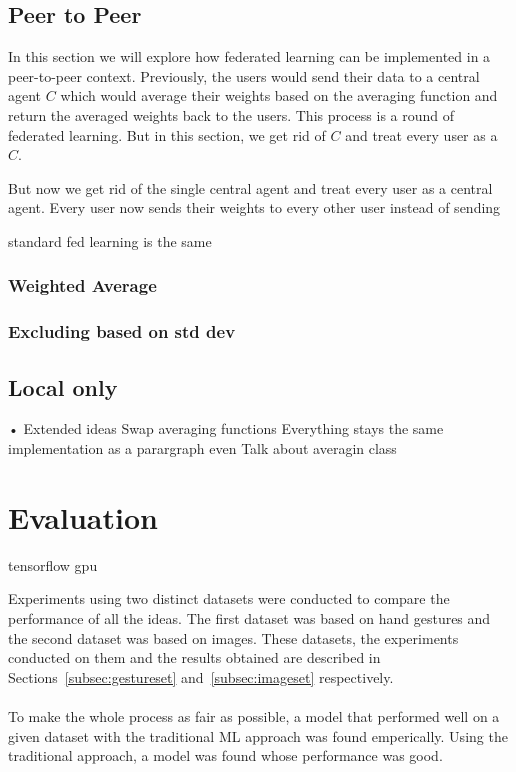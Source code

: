 \documentclass[12pt]{article}
\begin{document}
\subsection{Peer to Peer}
In this section we will explore how federated learning can be implemented in a peer-to-peer context. Previously, the users would send their data to a central agent $C$ which would average their weights based on the averaging function and return the averaged weights back to the users. This process is a round of federated learning. But in this section, we get rid of $C$ and treat every user as a $C$. 

But now we get rid of the single central agent and treat every user as a central agent. Every user now sends their weights to every other user instead of sending 

standard fed learning is the same
\subsubsection{Weighted Average}
\subsubsection{Excluding based on std dev}
\subsection{Local only}
	• Extended ideas
		Swap averaging functions
		Everything stays the same
		implementation as a parargraph even
		Talk about averagin class

\clearpage

\section{Evaluation}\label{sec:experiments}


tensorflow gpu


Experiments using two distinct datasets were conducted to compare the performance of all the ideas. The first dataset was based on hand gestures and the second dataset was based on images. These datasets, the experiments conducted on them and the results obtained are described in Sections~\ref{subsec:gestureset} and~\ref{subsec:imageset} respectively.
\\\\
To make the whole process as fair as possible, a model that performed well on a given dataset with the traditional ML approach was found emperically. Using the traditional approach, a model was found whose performance was good.
\end{document}
